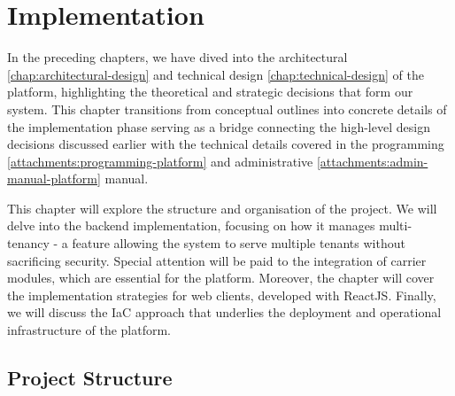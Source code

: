 \chapter{Implementation}
\label{chap:implementation}

In the preceding chapters, we have dived into the architectural \ref{chap:architectural-design} and technical design \ref{chap:technical-design} of the platform, highlighting the theoretical and strategic decisions that form our system.
This chapter transitions from conceptual outlines into concrete details of the implementation phase serving as a bridge connecting the high-level design decisions discussed earlier with the technical details covered in the programming \ref{attachments:programming-platform} and administrative \ref{attachments:admin-manual-platform} manual.

This chapter will explore the structure and organisation of the project.
We will delve into the backend implementation, focusing on how it manages multi-tenancy - a feature allowing the system to serve multiple tenants without sacrificing security.
Special attention will be paid to the integration of carrier modules, which are essential for the platform.
Moreover, the chapter will cover the implementation strategies for web clients, developed with ReactJS.
Finally, we will discuss the \ac{IaC} approach that underlies the deployment and operational infrastructure of the platform.


\section{Project Structure}
\label{sec:project-structure}


